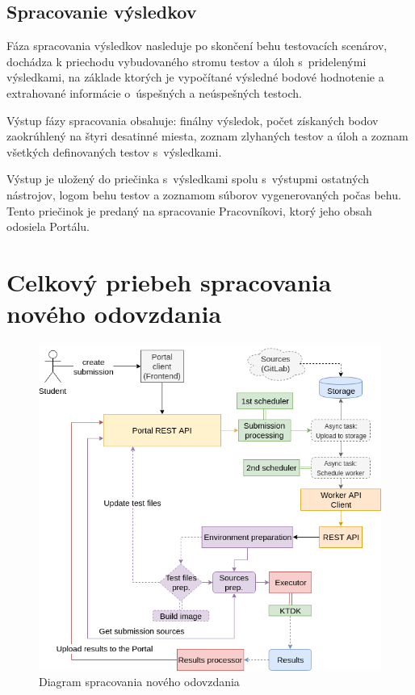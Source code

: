 \documentclass[
  digital, %
  oneside, %
  table,   %
  lof,     %
  lot,   %
]{fithesis3}
\begin{document}
\subsection{Spracovanie výsledkov}

Fáza spracovania výsledkov nasleduje po skončení behu testovacích scenárov, dochádza k priechodu vybudovaného stromu testov a úloh s~pridelenými výsledkami, na základe ktorých je vypočítané výsledné bodové hodnotenie a extrahované informácie o~úspešných a neúspešných testoch.

Výstup fázy spracovania obsahuje: finálny výsledok, počet získaných bodov zaokrúhlený na štyri desatinné miesta, zoznam zlyhaných testov a úloh a zoznam všetkých definovaných testov s~výsledkami.

Výstup je uložený do priečinka s~výsledkami spolu s~výstupmi ostatných nástrojov, logom behu testov a zoznamom súborov vygenerovaných počas behu. Tento priečinok je predaný na spracovanie Pracovníkovi, ktorý jeho obsah odosiela Portálu.

\section{Celkový priebeh spracovania nového odovzdania}

\begin{figure}[h]
  \begin{center}
    \includegraphics[width=\textwidth]{imgs/create-subm.png}
  \end{center}
    \caption{Diagram spracovania nového odovzdania}
    \label{fig:create-subm}
\end{figure}
\end{document}

